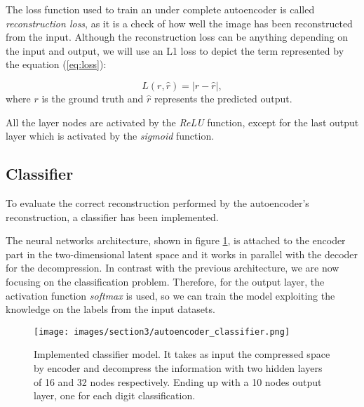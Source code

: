 \documentclass{article}
\begin{document}
\par The loss function used to train an under complete autoencoder is called \textit{reconstruction loss},
as it is a check of how well the image has been reconstructed from the input.
Although the reconstruction loss can be anything depending on the input and output,
we will use an L1 loss to depict the term represented by the equation (\ref{eq:loss}):

\begin{equation}
  L ( r, \hat{r} ) = | r - \hat{r} |,
  \label{eq:loss} 
\end{equation}
where $r$ is the ground truth and $\hat{r}$ represents the predicted output.

\par All the layer nodes are activated by the \textit{ReLU} function, 
except for the last output layer which is activated by the \textit{sigmoid} function. 



\subsection{Classifier}

To evaluate the correct reconstruction performed by the autoencoder's reconstruction, a classifier has been implemented.
\par The neural networks architecture, shown in figure \ref{fig:classifier}, is attached to the encoder part in the two-dimensional
latent space and it works in parallel with the decoder for the decompression. 
In contrast with the previous architecture, we are now focusing on the classification problem. 
Therefore, for the output layer, the activation function \textit{softmax} is used, so we can train the model exploiting 
the knowledge on the labels from the input datasets.

\begin{figure}[H]
  \centering
  \texttt{[image: images/section3/autoencoder\_classifier.png]}
  \caption{Implemented classifier model. It takes as input the compressed space by encoder
  and decompress the information with two hidden layers of 16 and 32 nodes respectively. 
  Ending up with a 10 nodes output layer, one for each digit classification.}
  \label{fig:classifier}
  \end{figure}

\end{document}

